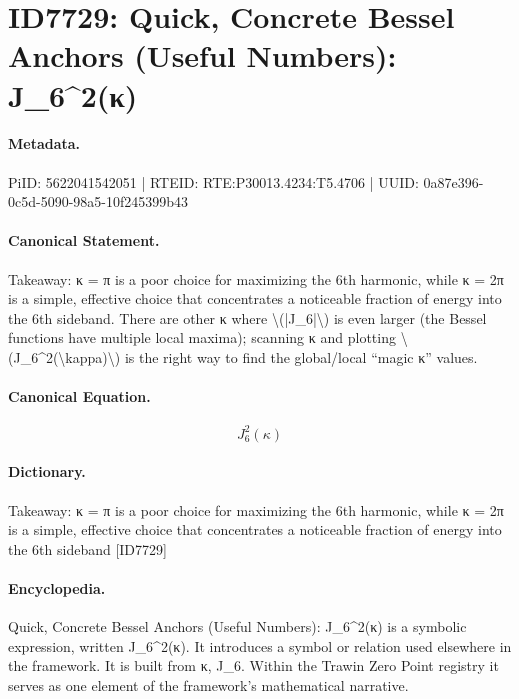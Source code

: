 \section*{ID7729: Quick, Concrete Bessel Anchors (Useful Numbers): J\_6\textasciicircum{}2(κ)}
\paragraph{Metadata.}
PiID: 5622041542051 | RTEID: RTE:P30013.4234:T5.4706 | UUID: 0a87e396-0c5d-5090-98a5-10f245399b43

\paragraph{Canonical Statement.}
Takeaway: κ = π is a poor choice for maximizing the 6th harmonic, while κ = 2π is a simple, effective choice that concentrates a noticeable fraction of energy into the 6th sideband. There are other κ where \textbackslash{}(|J\_6|\textbackslash{}) is even larger (the Bessel functions have multiple local maxima); scanning κ and plotting \textbackslash{}(J\_6\textasciicircum{}2(\textbackslash{}kappa)\textbackslash{}) is the right way to find the global/local “magic κ” values.

\paragraph{Canonical Equation.}
\[
J_6^2(\kappa)
\]

\paragraph{Dictionary.}
Takeaway: κ = π is a poor choice for maximizing the 6th harmonic, while κ = 2π is a simple, effective choice that concentrates a noticeable fraction of energy into the 6th sideband [ID7729]

\paragraph{Encyclopedia.}
Quick, Concrete Bessel Anchors (Useful Numbers): J\_6\textasciicircum{}2(κ) is a symbolic expression, written J\_6\textasciicircum{}2(κ). It introduces a symbol or relation used elsewhere in the framework. It is built from κ, J\_6. Within the Trawin Zero Point registry it serves as one element of the framework's mathematical narrative.
